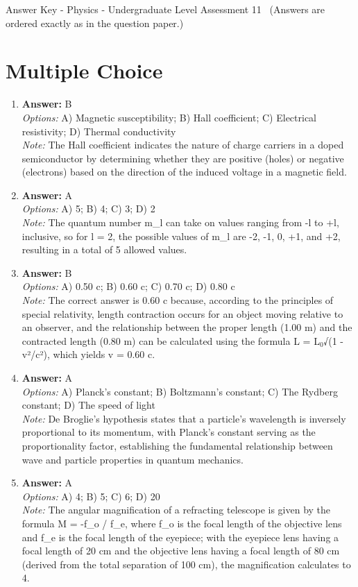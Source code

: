 \documentclass[12pt]{article}
\begin{document}
\begin{center}
Answer Key - Physics - Undergraduate Level Assessment 11 \
\small (Answers are ordered exactly as in the question paper.)
\end{center}

\section*{Multiple Choice}
\begin{enumerate}[label=\arabic*.]
\item \textbf{Answer:} B
\\ \textit{Options:} A) Magnetic susceptibility; B) Hall coefficient; C) Electrical resistivity; D) Thermal conductivity
\\ \textit{Note:} The Hall coefficient indicates the nature of charge carriers in a doped semiconductor by determining whether they are positive (holes) or negative (electrons) based on the direction of the induced voltage in a magnetic field.
\item \textbf{Answer:} A
\\ \textit{Options:} A) 5; B) 4; C) 3; D) 2
\\ \textit{Note:} The quantum number m\_l can take on values ranging from -l to +l, inclusive, so for l = 2, the possible values of m\_l are -2, -1, 0, +1, and +2, resulting in a total of 5 allowed values.
\item \textbf{Answer:} B
\\ \textit{Options:} A) 0.50 c; B) 0.60 c; C) 0.70 c; D) 0.80 c
\\ \textit{Note:} The correct answer is 0.60 c because, according to the principles of special relativity, length contraction occurs for an object moving relative to an observer, and the relationship between the proper length (1.00 m) and the contracted length (0.80 m) can be calculated using the formula L = L$_{0}$√(1 - v²/c²), which yields v = 0.60 c.
\item \textbf{Answer:} A
\\ \textit{Options:} A) Planck's constant; B) Boltzmann's constant; C) The Rydberg constant; D) The speed of light
\\ \textit{Note:} De Broglie's hypothesis states that a particle's wavelength is inversely proportional to its momentum, with Planck's constant serving as the proportionality factor, establishing the fundamental relationship between wave and particle properties in quantum mechanics.
\item \textbf{Answer:} A
\\ \textit{Options:} A) 4; B) 5; C) 6; D) 20
\\ \textit{Note:} The angular magnification of a refracting telescope is given by the formula M = -f\_o / f\_e, where f\_o is the focal length of the objective lens and f\_e is the focal length of the eyepiece; with the eyepiece lens having a focal length of 20 cm and the objective lens having a focal length of 80 cm (derived from the total separation of 100 cm), the magnification calculates to 4.
\end{enumerate}
\end{document}

